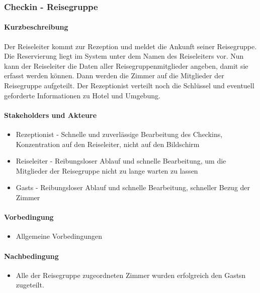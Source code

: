 \subsubsection{Checkin - Reisegruppe}
\label{UseCase_CheckinReisegruppe}

\paragraph{Kurzbeschreibung}
Der \Gls{Reiseleiter} kommt zur \Gls{Rezeption} und meldet die Ankunft seiner Reisegruppe. Die \Gls{Reservierung} liegt im System unter dem Namen des \Gls{Reiseleiter}s vor. Nun kann der \Gls{Reiseleiter} die Daten aller Reisegruppenmitglieder angeben, damit sie erfasst werden können.
Dann werden die \Gls{Zimmer} auf die Mitglieder der Reisegruppe aufgeteilt. Der \Gls{Rezeptionist} verteilt noch die Schlüssel und eventuell geforderte Informationen zu Hotel und Umgebung.

\paragraph{Stakeholders und Akteure}
\begin{itemize}
	\item \Gls{Rezeptionist} - Schnelle und zuverlässige Bearbeitung des \Gls{Checkin}s, Konzentration auf den  \Gls{Reiseleiter}, nicht auf den Bildschirm
	\item \Gls{Reiseleiter} - Reibungsloser Ablauf und schnelle Bearbeitung, um die Mitglieder der Reisegruppe nicht zu lange warten zu lassen
	\item \Glspl{Gast} - Reibungsloser Ablauf und schnelle Bearbeitung, schneller Bezug der \Gls{Zimmer}
\end{itemize}

\paragraph{Vorbedingung}
\begin{itemize}
	\item Allgemeine Vorbedingungen
\end{itemize}

\paragraph{Nachbedingung}
\begin{itemize}
	\item Alle der Reisegruppe zugeordneten \Gls{Zimmer} wurden erfolgreich den \Glspl{Gast}n zugeteilt.
\end{itemize}

